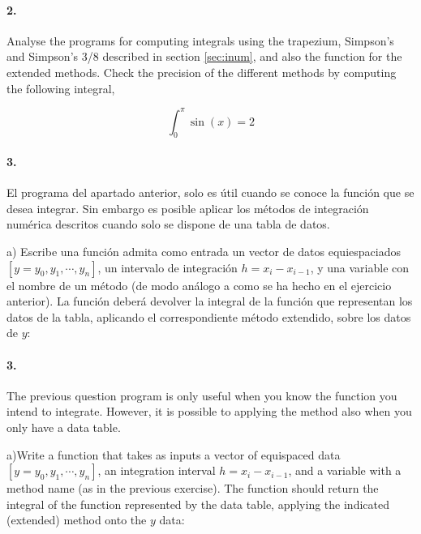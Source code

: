 \begin{paracol}{2}
\paragraph{2.} Analyse the programs for computing integrals using the trapezium, Simpson's and Simpson's 3/8 described in section \ref{sec:inum}, and also the function for the extended methods. Check the precision of the different methods by computing the following integral,  
\end{paracol}
\begin{equation*}
\int_0^{\pi} \sin(x) = 2
\end{equation*}
\begin{paracol}{2}
	
\paragraph{3.} El programa del apartado anterior, solo es útil cuando se conoce la función que se desea integrar. Sin embargo es posible aplicar los métodos de integración numérica descritos cuando solo se dispone de una tabla de datos. 


a) Escribe una función admita como entrada un vector de datos equiespaciados $[y= y_0,y_1,\cdots,y_n]$, un intervalo de integración $h=x_i - x_{i-1}$, y una variable con el nombre de un método (de modo análogo a como se ha hecho en el ejercicio anterior). La función deberá devolver la integral de la función que representan los datos de la tabla, aplicando el correspondiente método extendido, sobre los datos de $y$:

\switchcolumn
\paragraph{3.} The previous question program is only useful when you know the function you intend to integrate. However, it is possible to applying the method also when you only have a data table.

a)Write a function that takes as inputs a vector of equispaced data $[y= y_0,y_1,\cdots,y_n]$, an integration interval $h=x_i - x_{i-1}$,  and a variable with a method name (as in the previous exercise). The function should return the integral of the function represented by the data table, applying the  indicated (extended) method onto the $y$ data:
\end{paracol}
